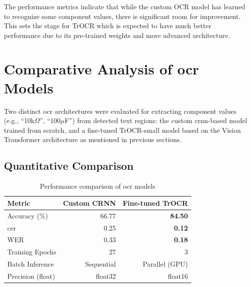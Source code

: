 The performance metrics indicate that while the custom OCR model has learned to recognize some component values, there is significant room for improvement. This sets the stage for TrOCR which is expected to have much better performance due to its pre-trained weights and more advanced architecture. 

\section{Comparative Analysis of \gls{ocr} Models}

Two distinct \gls{ocr} architectures were evaluated for extracting component values (e.g., ``10k$\Omega$'', ``100$\mu$F'') from detected text regions: the custom \gls{crnn}-based model trained from scratch, and a fine-tuned TrOCR-small model based on the Vision Transformer architecture as mentioned in previous sections.

\subsection{Quantitative Comparison}

\begin{table}[H]
    \centering
    \caption{Performance comparison of \gls{ocr} models}
    \label{table:ocr-comparison}
    \begin{tabular}{lrr}
        \toprule
        \textbf{Metric} & \textbf{Custom CRNN} & \textbf{Fine-tuned TrOCR} \\
        \midrule
        Accuracy (\%)         & 66.77 & \textbf{84.50} \\
        \gls{cer}             & 0.25  & \textbf{0.12} \\
        WER                   & 0.33  & \textbf{0.18} \\
        Training Epochs       & 27    & 3 \\
        Batch Inference       & Sequential & Parallel (GPU) \\
        Precision (float)     & float32 & float16 \\
        \bottomrule
    \end{tabular}
\end{table}

